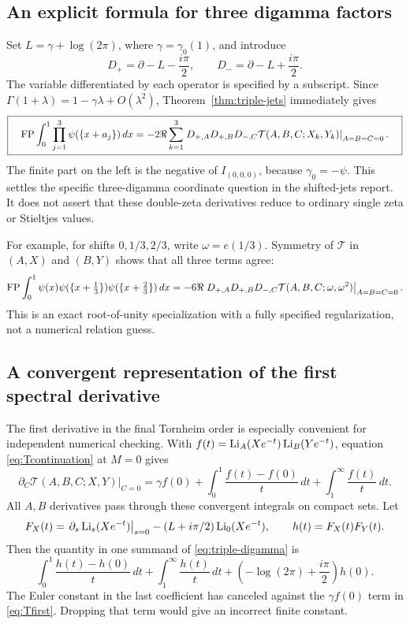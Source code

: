 \subsection{An explicit formula for three digamma factors}

Set $L=\gamma+\log(2\pi)$, where $\gamma=\gamma_0(1)$, and introduce
\[
 D_+=\partial-L-\frac{i\pi}{2},\qquad
 D_-=\partial-L+\frac{i\pi}{2}.
\]
The variable differentiated by each operator is specified by a subscript.
Since $\Gamma(1+\lambda)=1-\gamma\lambda+O(\lambda^2)$,
Theorem~\ref{thm:triple-jets} immediately gives
\begin{equation}\label{eq:triple-digamma}
 \boxed{\quad
 \operatorname{FP}\int_0^1\prod_{j=1}^{3}\psi(\{x+a_j\})\,dx
 =-2\Re\sum_{k=1}^{3}
 \left.
  D_{+,A}D_{+,B}D_{-,C}\mathcal T(A,B,C;X_k,Y_k)
 \right|_{A=B=C=0}.
 \quad}
\end{equation}
The finite part on the left is the negative of
$I_{(0,0,0)}$, because $\gamma_0=-\psi$.  This settles the specific
three-digamma coordinate question in the shifted-jets report.
It does not assert that these double-zeta derivatives reduce to ordinary
single zeta or Stieltjes values.

For example, for shifts $0,1/3,2/3$, write $\omega=e(1/3)$.  Symmetry of
$\mathcal T$ in $(A,X)$ and $(B,Y)$ shows that all three terms agree:
\begin{equation}\label{eq:triple-third}
 \operatorname{FP}\int_0^1\psi(x)\psi(\{x+\tfrac13\})
              \psi(\{x+\tfrac23\})\,dx
 =-6\Re\left.
 D_{+,A}D_{+,B}D_{-,C}\mathcal T(A,B,C;\omega,\omega^2)
 \right|_{A=B=C=0}.
\end{equation}
This is an exact root-of-unity specialization with a fully specified
regularization, not a numerical relation guess.

\subsection{A convergent representation of the first spectral derivative}

The first derivative in the final Tornheim order is especially convenient
for independent numerical checking.  With
$f(t)=\operatorname{Li}_A(Xe^{-t})\operatorname{Li}_B(Ye^{-t})$, equation
\eqref{eq:Tcontinuation} at $M=0$ gives
\begin{equation}\label{eq:Tfirst}
 \left.\partial_C\mathcal T(A,B,C;X,Y)\right|_{C=0}
 =\gamma f(0)+\int_0^1\frac{f(t)-f(0)}t\,dt
                    +\int_1^\infty\frac{f(t)}t\,dt.
\end{equation}
All $A,B$ derivatives pass through these convergent integrals on compact
sets.  Let
\[
 F_X(t)=\left.\partial_s\operatorname{Li}_s(Xe^{-t})\right|_{s=0}
            -(L+i\pi/2)\operatorname{Li}_0(Xe^{-t}),\qquad h(t)=F_X(t)F_Y(t).
\]
Then the quantity in one summand of \eqref{eq:triple-digamma} is
\begin{equation}\label{eq:triple-computable}
 \int_0^1\frac{h(t)-h(0)}t\,dt+
 \int_1^\infty\frac{h(t)}t\,dt+
       \left(-\log(2\pi)+\frac{i\pi}{2}\right)h(0).
\end{equation}
The Euler constant in the last coefficient has canceled against the
$\gamma f(0)$ term in \eqref{eq:Tfirst}.  Dropping that term would give
an incorrect finite constant.

